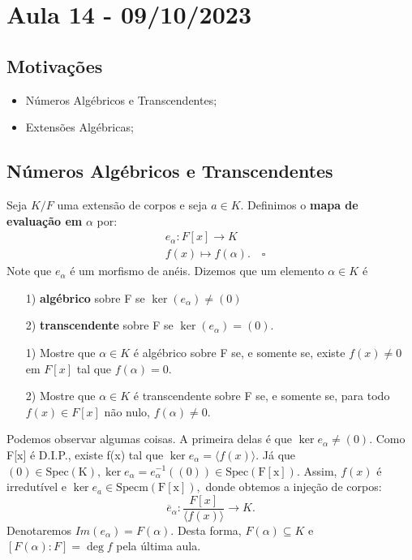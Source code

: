 \documentclass[algebraII_notes.tex]{subfiles}
\begin{document}
\section{Aula 14 - 09/10/2023}
\subsection{Motivações}
\begin{itemize}
	\item Números Algébricos e Transcendentes;
	\item Extensões Algébricas;
\end{itemize}
\subsection{Números Algébricos e Transcendentes}
\begin{def*}
	Seja \(K/F\) uma extensão de corpos e seja \(a\in K\). Definimos o \textbf{mapa de evaluação em} \(\alpha \) por:
	\begin{align*}
		 & e_{\alpha }:F[x]\rightarrow K       \\
		 & f(x)\mapsto f(\alpha ).\quad\square
	\end{align*}
	Note que \(e_{\alpha }\) é um morfismo de anéis. Dizemos que um elemento \(\alpha \in K\) é
	\begin{itemize}
		\item[1)] \textbf{algébrico} sobre F se \(\ker{(e_{\alpha })}\neq(0)\)
		\item[2)] \textbf{transcendente} sobre F se \(\ker{(e_{\alpha })}=(0).\)
	\end{itemize}
\end{def*}
\begin{example}[Exercícios]
	\begin{itemize}
		\item[1)] Mostre que \(\alpha \in K\) é algébrico sobre F se, e somente se, existe \(f(x)\neq 0\) em \(F[x]\) tal que
		      \(f(\alpha ) = 0.\)
		\item[2)] Mostre que \(\alpha \in K\) é transcendente sobre F se, e somente se, para todo
		      \(f(x)\in F[x]\) não nulo, \(f(\alpha)\neq0.\)
	\end{itemize}
\end{example}
Podemos observar algumas coisas. A primeira delas é que \(\ker{e_{\alpha }}\neq(0).\) Como
F[x] é D.I.P., existe f(x) tal que \(\ker{e_{\alpha }} = \langle f(x) \rangle.\) Já que \((0)\in \mathrm{Spec(K)}, \ker{e_{\alpha }}=e_{\alpha }^{-1}((0))\in \mathrm{Spec(F[x])}.\)
Assim, \(f(x)\) é irredutível e \(\ker{e_{a}}\in \mathrm{Specm(F[x])},\) donde obtemos a injeção de corpos:
\[
	\overline{e}_{\alpha }:\frac{F[x]}{\langle f(x) \rangle}\rightarrow K.
\]
Denotaremos \(Im(e_{\alpha }) = F(\alpha ).\) Desta forma, \(F(\alpha )\subseteq{K}\) e \([F(\alpha ): F]=\deg{f}\) pela última aula.
\end{document}
